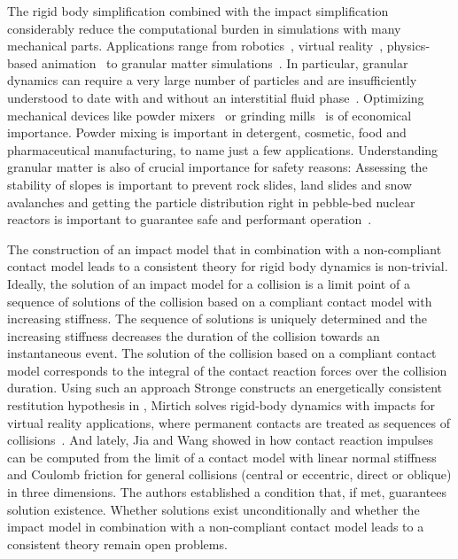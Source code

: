 \documentclass[global,twocolumn]{svjour}
\begin{document}
		The rigid body simplification combined with the impact simplification considerably reduce the computational
		burden in simulations with many mechanical parts. Applications range from robotics~\cite{nuseirat00,jia13},
		virtual reality~\cite{sauer98}, physics-based animation~\cite{erleben04} to granular matter simulations~\cite{tasora10}.
		In particular, granular dynamics can require a very large number of particles and are insufficiently understood
		to date with and without an interstitial fluid phase~\cite{mitarai12}. Optimizing mechanical devices like
		powder mixers~\cite{hassanpour11} or grinding mills~\cite{mishra92,jayasundara11} is of economical importance.
		Powder mixing is important in detergent, cosmetic, food and pharmaceutical manufacturing, to name just a few applications. Understanding
		granular matter is also of crucial importance for safety reasons: Assessing the stability of slopes is
		important to prevent rock slides, land slides and snow avalanches and getting the particle distribution right
		in pebble-bed nuclear reactors is important to guarantee safe and performant operation~\cite{tasora10}.

		The construction of an impact model that in combination with a non-compliant contact model leads to
		a consistent theory for rigid body dynamics is non-trivial. Ideally, the solution of an impact model
		for a collision is a limit point of a sequence of solutions of the collision based on a compliant contact
		model with increasing stiffness. The sequence of solutions is uniquely determined and the increasing
		stiffness decreases the duration of the collision towards an instantaneous event. The solution of
		the collision based on a compliant contact model corresponds to the integral of the contact reaction
		forces over the collision duration. Using such an approach Stronge constructs an energetically consistent restitution
		hypothesis in \cite{stronge90}, Mirtich solves rigid-body dynamics with impacts for virtual reality applications,
		where permanent contacts are treated as sequences of collisions~\cite{mirtich95, mirtich96}.
		And lately, Jia and Wang showed in \cite{jia16} how contact reaction impulses can be computed from the limit of a
		contact model with linear normal stiffness and Coulomb friction for general collisions
		(central or eccentric, direct or oblique) in three dimensions. The authors established a condition
		that, if met, guarantees solution existence. Whether solutions exist unconditionally
		and whether the impact model in combination with a non-compliant contact model leads to
		a consistent theory remain open problems.
\end{document}
